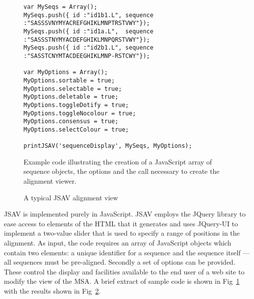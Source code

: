 \documentclass[a4]{article}
\begin{document}
\begin{figure}
\footnotesize
\begin{verbatim}
var MySeqs = Array();
MySeqs.push({ id :"id1b1.L", sequence :"SASSSVNYMYACREFGHIKLMNPTRSTVWY"});
MySeqs.push({ id :"id1a.L",  sequence :"SASSSTNYMYACDEFGHIKLMNPQRSTVWY"});
MySeqs.push({ id :"id2b1.L", sequence :"SASSTCNYMTACDEEGHIKLMNP-RSTCWY"});

var MyOptions = Array();
MyOptions.sortable = true;
MyOptions.selectable = true;
MyOptions.deletable = true;
MyOptions.toggleDotify = true;
MyOptions.toggleNocolour = true;
MyOptions.consensus = true;
MyOptions.selectColour = true;

printJSAV('sequenceDisplay', MySeqs, MyOptions);
\end{verbatim}
\caption{\label{fig:code}Example code illustrating the creation of a
JavaScript array of sequence objects, the options and the call
necessary to create the alignment viewer.}
\end{figure}

\begin{figure}
\caption{\label{fig:demo}A typical JSAV alignment view}
\end{figure}

JSAV is implemented purely in JavaScript. JSAV employs the JQuery
library to ease access to elements of the HTML that it generates and
uses JQuery-UI to implement a two-value slider that is used to specify
a range of positions in the alignment.  As input, the code requires an
array of JavaScript objects which contain two elements: a unique
identifier for a sequence and the sequence itself --- all sequences
must be pre-aligned.  Secondly a set of options can be provided. These
control the display and facilities available to the end user of a web
site to modify the view of the MSA.  A brief extract of sample code is
shown in Fig~\ref{fig:code} with the results shown in
Fig~\ref{fig:demo}.
\end{document}
